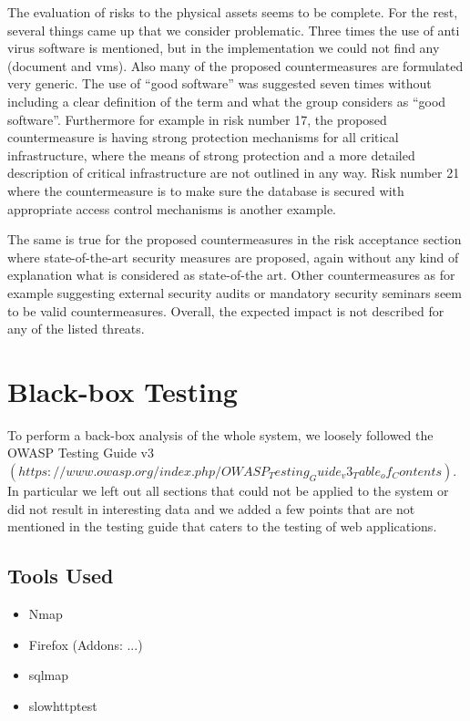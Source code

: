 \documentclass{article}
\begin{document}
The evaluation of risks to the physical assets seems to be complete. For the rest, several things came up that we consider problematic. Three times the use of anti virus software is mentioned, but in the implementation we could not find any (document and vms). Also many of the proposed countermeasures are formulated very generic. The use of ``good software'' was suggested seven times without including a clear definition of the term and what the group considers as ``good software''.\newline
Furthermore for example in risk number 17, the proposed countermeasure is having strong protection mechanisms for all critical infrastructure, where the means of strong protection and a more detailed description of critical infrastructure are not outlined in any way. Risk number 21 where the countermeasure is to make sure the database is secured with appropriate access control mechanisms is another example.

The same is true for the proposed countermeasures in the risk acceptance section where state-of-the-art security measures are proposed, again without any kind of explanation what is considered as state-of-the art. Other countermeasures as for example suggesting external security audits or mandatory security seminars seem to be valid countermeasures. Overall, the expected impact is not described for any of the listed threats.

\section{Black-box Testing}
To perform a back-box analysis of the whole system, we loosely followed the OWASP Testing Guide v3 $(https://www.owasp.org/index.php/OWASP_Testing_Guide_v3_Table_of_Contents)$. In particular we left out all sections that could not be applied to the system or did not result in interesting data and we added a few points that are not mentioned in the testing guide that caters to the testing of web applications.

\subsection{Tools Used}
\begin{itemize}
\item Nmap
\item Firefox (Addons: ...)
\item sqlmap
\item slowhttptest
\end{itemize}
\end{document}
